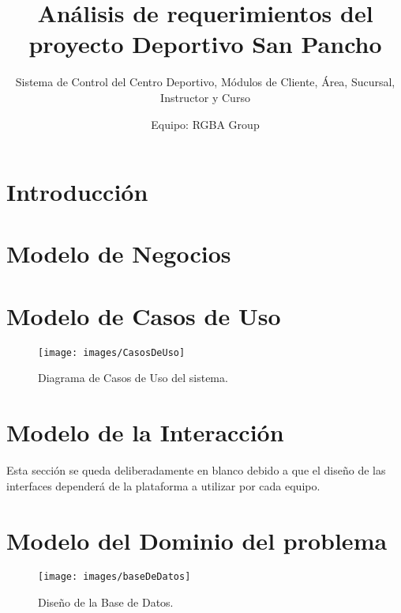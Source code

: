 \documentclass[oneside,10pt]{book}
\title{Análisis de requerimientos del proyecto Deportivo San Pancho}
\subtitle{Sistema de Control del Centro Deportivo, Módulos de Cliente, Área, Sucursal, Instructor y Curso}
\author{Equipo: RGBA Group}
\begin{document}
\maketitle
\thispagestyle{empty}

\frontmatter
\tableofcontents

\mainmatter
\chapter{Introducción}

\chapter{Modelo de Negocios}


\chapter{Modelo de Casos de Uso}

\begin{figure}[htbp!]
		\centering
			\texttt{[image: images/CasosDeUso]}
		\caption{Diagrama de Casos de Uso del sistema.}
	\end{figure}
	

\chapter{Modelo de la Interacción}

{\color{UCInterfaceColor} 
	Esta sección se queda deliberadamente en blanco debido a que el diseño de las interfaces dependerá de la plataforma a utilizar por cada equipo.\\	
}


\chapter{Modelo del Dominio del problema}

	\begin{figure}[htbp!]
		\centering
			\texttt{[image: images/baseDeDatos]}
		\caption{Diseño de la Base de Datos.}
	\end{figure}
	
\end{document}
